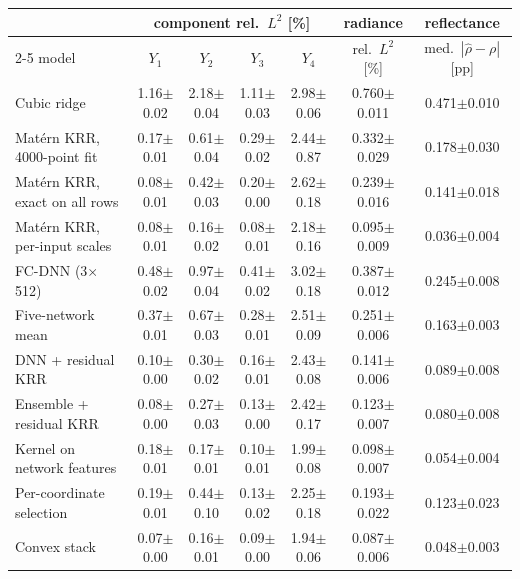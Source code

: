 \begin{tabular}{lcccccc}
\toprule
 & \multicolumn{4}{c}{component rel.\ $L^2$ [\%]} & radiance & reflectance \\
\cmidrule(lr){2-5}
model & $Y_1$ & $Y_2$ & $Y_3$ & $Y_4$ & rel.\ $L^2$ [\%] & med.\ $|\hat\rho-\rho|$ [pp] \\
\midrule
Cubic ridge & 1.16$\pm$0.02 & 2.18$\pm$0.04 & 1.11$\pm$0.03 & 2.98$\pm$0.06 & 0.760$\pm$0.011 & 0.471$\pm$0.010 \\
Mat\'ern KRR, 4000-point fit & 0.17$\pm$0.01 & 0.61$\pm$0.04 & 0.29$\pm$0.02 & 2.44$\pm$0.87 & 0.332$\pm$0.029 & 0.178$\pm$0.030 \\
Mat\'ern KRR, exact on all rows & 0.08$\pm$0.01 & 0.42$\pm$0.03 & 0.20$\pm$0.00 & 2.62$\pm$0.18 & 0.239$\pm$0.016 & 0.141$\pm$0.018 \\
Mat\'ern KRR, per-input scales & 0.08$\pm$0.01 & 0.16$\pm$0.02 & 0.08$\pm$0.01 & 2.18$\pm$0.16 & 0.095$\pm$0.009 & 0.036$\pm$0.004 \\
FC-DNN (3$\times$512) & 0.48$\pm$0.02 & 0.97$\pm$0.04 & 0.41$\pm$0.02 & 3.02$\pm$0.18 & 0.387$\pm$0.012 & 0.245$\pm$0.008 \\
Five-network mean & 0.37$\pm$0.01 & 0.67$\pm$0.03 & 0.28$\pm$0.01 & 2.51$\pm$0.09 & 0.251$\pm$0.006 & 0.163$\pm$0.003 \\
DNN + residual KRR & 0.10$\pm$0.00 & 0.30$\pm$0.02 & 0.16$\pm$0.01 & 2.43$\pm$0.08 & 0.141$\pm$0.006 & 0.089$\pm$0.008 \\
Ensemble + residual KRR & 0.08$\pm$0.00 & 0.27$\pm$0.03 & 0.13$\pm$0.00 & 2.42$\pm$0.17 & 0.123$\pm$0.007 & 0.080$\pm$0.008 \\
Kernel on network features & 0.18$\pm$0.01 & 0.17$\pm$0.01 & 0.10$\pm$0.01 & 1.99$\pm$0.08 & 0.098$\pm$0.007 & 0.054$\pm$0.004 \\
Per-coordinate selection & 0.19$\pm$0.01 & 0.44$\pm$0.10 & 0.13$\pm$0.02 & 2.25$\pm$0.18 & 0.193$\pm$0.022 & 0.123$\pm$0.023 \\
Convex stack & 0.07$\pm$0.00 & 0.16$\pm$0.01 & 0.09$\pm$0.00 & 1.94$\pm$0.06 & 0.087$\pm$0.006 & 0.048$\pm$0.003 \\
\bottomrule
\end{tabular}
